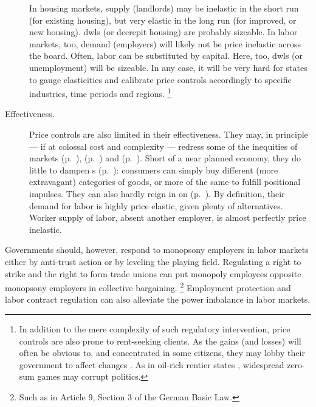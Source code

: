 \begin{description}
	In housing markets, supply (landlords) may be inelastic in the short run (for existing housing), but very elastic in the long run (for improved, or new housing).
	\glspl{dwl} (or decrepit housing) are probably sizeable.
	In labor markets, too, demand (employers) will likely not be price inelastic across the board.
	Often, labor can be substituted by capital.
	Here, too, \glspl{dwl} (or unemployment) will be sizeable.
	In any case, it will be very hard for states to gauge elasticities and calibrate price controls accordingly to specific industries, time periods and regions.
	\footnote{
		In addition to the mere complexity of such regulatory intervention, price controls are also prone to rent-seeking clients.
		As the gains (and losses) will often be obvious to, and concentrated in some citizens, they may lobby their government to affect changes \citep{Peltzman1976,Posner1975,Krueger1974}.
		As in oil-rich rentier states \citep{Beblawi1990}, widespread zero-sum games may corrupt politics.
	}

	\item[Effectiveness.]
	Price controls are also limited in their effectiveness.
	They may, in principle --- if at colossal cost and complexity --- redress some of the inequities of  markets (p.~\pageref{sec:winner-take-all}),  (p.~\pageref{sec:different-budget-constraints}) and  (p.~\pageref{sec:diminishing-marginal-utility}).
	Short of a near planned economy, they do little to dampen s (p.~\pageref{sec:positional-race}):
	 consumers can simply buy different (more extravagant) categories of goods, or more of the same to fulfill positional impulses.
	They can also hardly reign in on  (p.~\pageref{sec:monopsony-employers}).
	By definition, their demand for labor is highly price elastic, given plenty of alternatives.
	Worker supply of labor, absent another employer, is almost perfectly price inelastic.
\end{description}

Governments should, however, respond to monopsony employers in labor markets either by anti-trust action or by leveling the playing field.
Regulating a right to strike and the right to form trade unions can put monopoly employees opposite monopsony employers in collective bargaining.
\footnote{
	Such as in Article 9, Section 3 of the German Basic Law.
}
Employment protection and labor contract regulation can also alleviate the power imbalance in labor markets.

